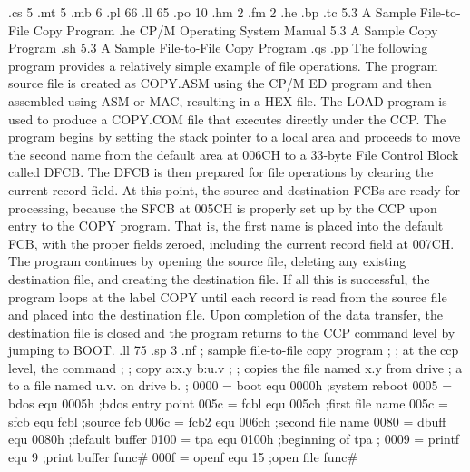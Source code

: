 
.cs 5
.mt 5
.mb 6
.pl 66
.ll 65
.po 10
.hm 2
.fm 2
.he
.bp
.tc    5.3  A Sample File-to-File Copy Program
.he CP/M Operating System Manual           5.3  A Sample Copy Program
.sh
5.3  A Sample File-to-File Copy Program
.qs
.pp
The following program provides a relatively simple example of file
operations.  The program source file is created as COPY.ASM using 
the CP/M ED program and then assembled using ASM or MAC, resulting 
in a HEX file.  The LOAD program is used to produce a COPY.COM 
file that executes directly under the CCP.  The program begins 
by setting the stack pointer to a local area and proceeds to move 
the second name from the default area at 006CH to a 33-byte File 
Control Block called DFCB.  The DFCB is then prepared for file 
operations by clearing the current record  field.  At this point, 
the source and destination FCBs are ready for processing, because 
the SFCB at 005CH is properly set up by the CCP upon entry to the 
COPY program.  That is, the first name is placed into the default 
FCB, with the proper fields zeroed, including the current record 
field at 007CH.  The program continues by opening the source 
file, deleting any existing destination file, and creating the destination
file.  If all this is successful, the program loops at the label
COPY until each record is read from the source file and placed into the 
destination file.  Upon completion of the data transfer, the
destination file is closed and the program returns to the
CCP command level by jumping to BOOT.
.ll 75
.sp 3
.nf
                            ;        sample file-to-file copy program
                            ;
                            ;        at the ccp level, the command
                            ;
                            ;             copy a:x.y b:u.v
                            ;
                            ;        copies the file named x.y from drive
                            ;        a to a file named u.v. on drive b.
                            ;
0000 =                      boot     equ 0000h      ;system reboot
0005 =                      bdos     equ 0005h      ;bdos entry point
005c =                      fcbl     equ 005ch      ;first file name
005c =                      sfcb     equ fcbl       ;source fcb
006c =                      fcb2     equ 006ch      ;second file name
0080 =                      dbuff    equ 0080h      ;default buffer
0100 =                      tpa      equ 0100h      ;beginning of tpa
                            ;
0009 =                      printf   equ 9          ;print buffer func#
000f =                      openf    equ 15         ;open file func#

